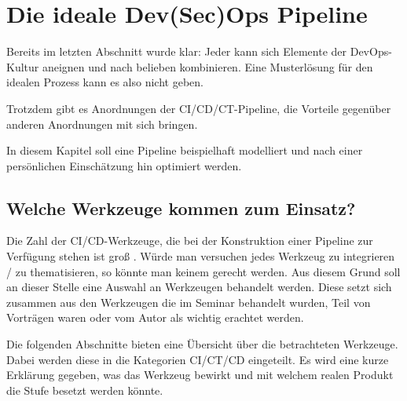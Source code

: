 \chapter{Die \glqq ideale\grqq{} Dev(Sec)Ops Pipeline}

Bereits im letzten Abschnitt wurde klar: Jeder kann sich Elemente der DevOps-Kultur aneignen und nach belieben kombinieren. 
Eine \glqq Musterlösung\grqq{} für den idealen Prozess kann es also nicht geben. 

Trotzdem gibt es Anordnungen der CI/CD/CT-Pipeline, die Vorteile gegenüber anderen Anordnungen mit sich bringen. 

In diesem Kapitel soll eine Pipeline beispielhaft modelliert und nach einer persönlichen Einschätzung hin optimiert werden.

\section{Welche Werkzeuge kommen zum Einsatz?}

Die Zahl der CI/CD-Werkzeuge, die bei der Konstruktion einer Pipeline zur Verfügung stehen ist groß \cite{xebialabsXebiaLabsPrasentiertPeriodensystem2018} \cite{digital.aiPeriodicTableDevOps}. Würde man versuchen jedes Werkzeug zu integrieren / zu thematisieren, so könnte man keinem gerecht werden.
Aus diesem Grund soll an dieser Stelle eine Auswahl an Werkzeugen behandelt werden. Diese setzt sich zusammen aus den Werkzeugen die im Seminar behandelt wurden, Teil von Vorträgen waren oder vom Autor als wichtig erachtet werden.

Die folgenden Abschnitte bieten eine Übersicht über die betrachteten Werkzeuge. Dabei werden diese in die Kategorien CI/CT/CD eingeteilt. Es wird eine kurze Erklärung gegeben, was das Werkzeug bewirkt und mit welchem realen Produkt die Stufe besetzt werden könnte.

